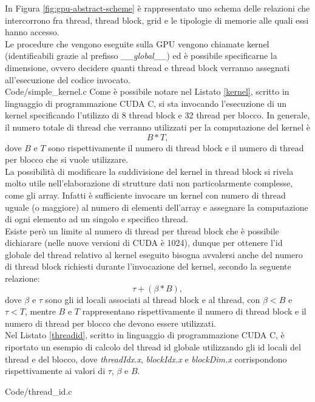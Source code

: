 In Figura \ref{fig:gpu-abstract-scheme} è rappresentato uno schema delle
relazioni che intercorrono fra thread, thread block, grid e le
tipologie di memorie alle quali essi hanno accesso.
\\
Le procedure che vengono eseguite sulla GPU vengono chiamate kernel
(identificabili grazie al prefisso \textit{\_\_global\_\_})
ed è possibile specificarne la dimensione, ovvero decidere quanti
thread e thread block verranno assegnati
all'esecuzione del codice invocato.
\\

    {Code/simple_kernel.c}
Come è possibile notare nel Listato \ref{kernel}, scritto in linguaggio di 
programmazione CUDA C, si sta invocando
l'esecuzione di un kernel specificando l'utilizzo di 8 thread block e
32 thread per blocco. In generale, il numero totale di
thread che verranno utilizzati per la computazione del kernel è
$$B * T,$$ dove $B$ e $T$
sono rispettivamente
il numero di thread block e il numero
di thread per blocco che si vuole utilizzare.
\\
La possibilità di modificare la suddivisione del kernel in thread block
si rivela molto utile nell'elaborazione di strutture dati non
particolarmente complesse, come gli array.
Infatti è sufficiente invocare un kernel con numero di thread
uguale (o maggiore) al numero di elementi dell'array e assegnare la
computazione di ogni elemento ad un singolo e specifico thread.
\\
Esiste però un limite al numero di thread per thread block che è possibile
dichiarare (nelle nuove versioni di CUDA è 1024), dunque per ottenere
l'id globale del thread relativo al kernel eseguito bisogna avvalersi anche
del numero di thread block richiesti durante l'invocazione del kernel,
secondo la seguente relazione:
$$\tau + (\beta * B),$$
dove $\beta$ e $\tau$ sono gli id locali associati al thread block e al thread, 
con $\beta < B$ e $\tau < T$, mentre $B$ e $T$ rappresentano rispettivamente 
il numero di thread block e il numero di thread per blocco che devono essere 
utilizzati.
\\
Nel Listato \ref{threadid}, scritto in linguaggio di programmazione
CUDA C, è riportato un esempio di calcolo del
thread id globale utilizzando gli id locali del thread e del blocco, dove
\textit{threadIdx.x}, \textit{blockIdx.x} e \textit{blockDim.x} corrispondono
rispettivamente ai valori di $\tau$, $\beta$ e $B$.


    {Code/thread_id.c}


